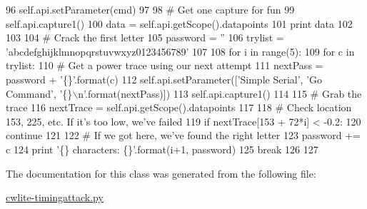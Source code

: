 \begin{DoxyCode}
96             self.api.setParameter(cmd)
97                        
98         \textcolor{comment}{# Get one capture for fun}
99         self.api.capture1()
100         data = self.api.getScope().datapoints
101         \textcolor{keywordflow}{print} data
102         
103         
104         \textcolor{comment}{# Crack the first letter}
105         password = \textcolor{stringliteral}{''}
106         trylist = \textcolor{stringliteral}{'abcdefghijklmnopqrstuvwxyz0123456789'}
107           
108         \textcolor{keywordflow}{for} i \textcolor{keywordflow}{in} range(5):
109             \textcolor{keywordflow}{for} c \textcolor{keywordflow}{in} trylist:
110                 \textcolor{comment}{# Get a power trace using our next attempt}
111                 nextPass = password + \textcolor{stringliteral}{'\{\}'}.format(c)
112                 self.api.setParameter([\textcolor{stringliteral}{'Simple Serial'}, \textcolor{stringliteral}{'Go Command'}, \textcolor{stringliteral}{'\{\}\(\backslash\)n'}.format(nextPass)])
113                 self.api.capture1()
114                 
115                 \textcolor{comment}{# Grab the trace}
116                 nextTrace = self.api.getScope().datapoints
117                 
118                 \textcolor{comment}{# Check location 153, 225, etc. If it's too low, we've failed}
119                 \textcolor{keywordflow}{if} nextTrace[153 + 72*i] < -0.2:
120                     \textcolor{keywordflow}{continue}
121                     
122                 \textcolor{comment}{# If we got here, we've found the right letter}
123                 password += c
124                 \textcolor{keywordflow}{print} \textcolor{stringliteral}{'\{\} characters: \{\}'}.format(i+1, password)
125                 \textcolor{keywordflow}{break}
126 
127 
\end{DoxyCode}


The documentation for this class was generated from the following file\+:\begin{DoxyCompactItemize}
\item 
\hyperlink{cwlite-timingattack_8py}{cwlite-\/timingattack.\+py}\end{DoxyCompactItemize}
